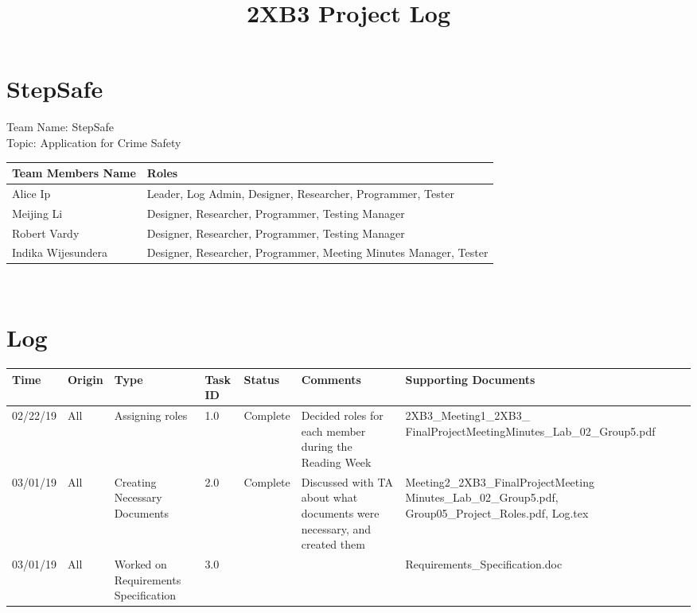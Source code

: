 \documentclass[10pt]{article}
\begin{document}
\title{2XB3 Project Log}
\maketitle

\section {StepSafe}
Team Name: StepSafe \\
Topic: Application for Crime Safety \\

 \begin{tabular}{|p{4cm}| p{10cm}|} 
 \hline
 Team Members Name & Roles \\
 \hline
  Alice Ip & Leader, Log Admin, Designer, Researcher, Programmer, Tester  \\
 \hline
  Meijing Li & Designer, Researcher, Programmer, Testing Manager  \\
 \hline
  Robert Vardy & Designer, Researcher, Programmer, Testing Manager  \\
 \hline
  Indika Wijesundera & Designer, Researcher, Programmer, Meeting Minutes Manager, Tester  \\
 \hline
 
\end{tabular} \\

\section{Log}
 \begin{tabular}{|p{1.5cm}| p{1cm}| p{2cm}| p{1cm}| p{1.5cm}| p{4cm}| p{5.5cm}|} 
 \hline
Time & Origin & Type & Task ID & Status & Comments & Supporting Documents   \\  
 \hline
 02/22/19 & All & Assigning roles & 1.0 & Complete & Decided roles for each member during the Reading Week & 2XB3\_Meeting1\_2XB3\_ FinalProjectMeetingMinutes\_Lab\_02\_Group5.pdf  \\
 \hline
 03/01/19 & All & Creating Necessary Documents & 2.0 & Complete & Discussed with TA about what documents were necessary, and created them & Meeting2\_2XB3\_FinalProjectMeeting Minutes\_Lab\_02\_Group5.pdf, Group05\_Project\_Roles.pdf, Log.tex \\
 \hline
  03/01/19 & All & Worked on Requirements Specification & 3.0 &  &  & Requirements\_Specification.doc \\
 \hline
\end{tabular}
\end{document}
